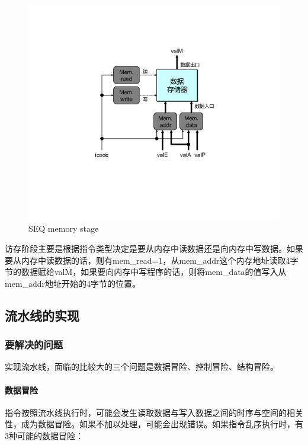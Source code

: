 \documentclass[12pt]{article}
\begin{document}
\begin{CJK*}{GB}{gbsn}
\begin{figure}[htbp]
\centering
\includegraphics{img/seq-memory.png}
\caption{SEQ memory stage}
\end{figure}

访存阶段主要是根据指令类型决定是要从内存中读数据还是向内存中写数据。如果要从内存中读数据的话，则有mem\_read=1，从mem\_addr这个内存地址读取4字节的数据赋给valM，如果要向内存中写程序的话，则将mem\_data的值写入从mem\_addr地址开始的4字节的位置。

\subsection{流水线的实现}\label{ux6d41ux6c34ux7ebfux7684ux5b9eux73b0}

\subsubsection{要解决的问题}\label{ux8981ux89e3ux51b3ux7684ux95eeux9898}

实现流水线，面临的比较大的三个问题是数据冒险、控制冒险、结构冒险。

\paragraph{数据冒险}\label{ux6570ux636eux5192ux9669}

指令按照流水线执行时，可能会发生读取数据与写入数据之间的时序与空间的相关性，成为数据冒险。如果不加以处理，可能会出现错误。如果指令乱序执行时，有3种可能的数据冒险：


\end{CJK*}
\end{document}
